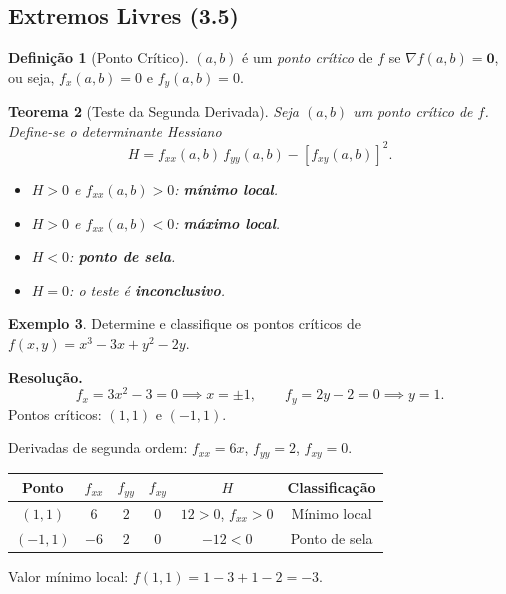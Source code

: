 \documentclass[12pt,a4paper]{article}
\newtheorem{theorem}{Teorema}[section]
\theoremstyle{definition}
\newtheorem{definition}[theorem]{Definição}
\newtheorem{example}[theorem]{Exemplo}
\theoremstyle{remark}
\begin{document}
\subsection{Extremos Livres (3.5)}

\begin{definition}[Ponto Crítico]
  $(a,b)$ é um \emph{ponto crítico} de $f$ se $\nabla f(a,b)=\mathbf{0}$,
  ou seja, $f_x(a,b)=0$ e $f_y(a,b)=0$.
\end{definition}

\begin{theorem}[Teste da Segunda Derivada]
  Seja $(a,b)$ um ponto crítico de $f$. Define-se o \emph{determinante
  Hessiano}
  \[
    H = f_{xx}(a,b)\,f_{yy}(a,b) - [f_{xy}(a,b)]^2.
  \]
  \begin{itemize}[nosep]
    \item $H > 0$ e $f_{xx}(a,b)>0$: \textbf{mínimo local}.
    \item $H > 0$ e $f_{xx}(a,b)<0$: \textbf{máximo local}.
    \item $H < 0$: \textbf{ponto de sela}.
    \item $H = 0$: o teste é \textbf{inconclusivo}.
  \end{itemize}
\end{theorem}

\begin{example}
  Determine e classifique os pontos críticos de
  $f(x,y)=x^3-3x+y^2-2y$.

  \textbf{Resolução.}
  \[
    f_x = 3x^2-3 = 0 \implies x=\pm 1,\qquad
    f_y = 2y-2 = 0 \implies y = 1.
  \]
  Pontos críticos: $(1,1)$ e $(-1,1)$.

  Derivadas de segunda ordem: $f_{xx}=6x$, $f_{yy}=2$, $f_{xy}=0$.

  \begin{center}
  \begin{tabular}{cccccc}
    \toprule
    Ponto & $f_{xx}$ & $f_{yy}$ & $f_{xy}$ & $H$ & Classificação \\
    \midrule
    $(1,1)$  & $6$  & $2$ & $0$ & $12>0$, $f_{xx}>0$ & Mínimo local \\
    $(-1,1)$ & $-6$ & $2$ & $0$ & $-12<0$ & Ponto de sela \\
    \bottomrule
  \end{tabular}
  \end{center}

  Valor mínimo local: $f(1,1) = 1-3+1-2 = -3$.
\end{example}
\end{document}
